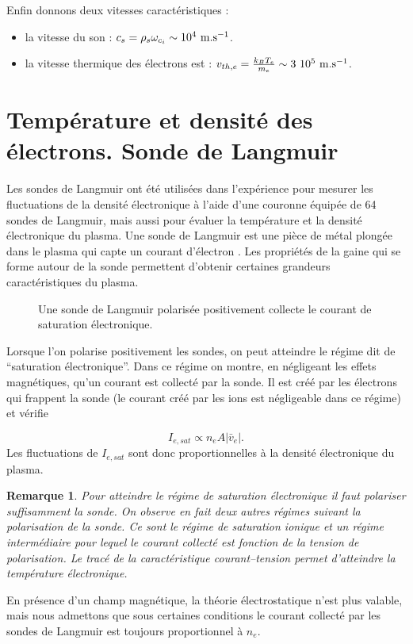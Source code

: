 \documentclass{book}
\newtheorem{rem}{Remarque}[chapter]
\begin{document}
Enfin donnons deux vitesses caract\'eristiques :
\begin{itemize}
\item la vitesse du son : $c_s=\rho_s\omega_{c_i}\sim 10^4 \ {\rm
m.s}^{-1}$. 
\item la vitesse thermique des \'electrons est :
$v_{th,e}=\frac{k_B T_e}{m_e}\sim 3\ 10^{5}\ {\rm m.s}^{-1}$.
\end{itemize}




\section{Temp\'erature et densit\'e des \'electrons. Sonde de Langmuir}
Les sondes de Langmuir ont \'et\'e utilis\'ees dans l'exp\'erience
pour 
mesurer les fluctuations de la densit\'e \'electronique \`a l'aide
d'une 
couronne \'equip\'ee de 64 sondes de Langmuir, mais aussi pour
\'evaluer la 
temp\'erature et la densit\'e \'electronique du plasma.
Une sonde de Langmuir est une pi\`ece de m\'etal plong\'ee
dans le plasma qui capte un courant d'\'electron \cite{Hershkowitz93}.
Les propri\'et\'es
\cite{Laframboise76,Rubinstein78,Rubinstein82,Rubinstein83}  de la
gaine qui se forme autour de la sonde permettent  
d'obtenir certaines grandeurs caract\'eristiques du plasma.
\begin{figure}[htb]
 \centerline{}   
 \caption{Une sonde de Langmuir polaris\'ee positivement collecte le
courant de saturation \'electronique.}
 \label{gainesonde}
\end{figure}
%
Lorsque l'on polarise positivement les sondes, on peut atteindre le
r\'egime dit de ``saturation \'electronique''. Dans ce r\'egime on
montre, 
en n\'egligeant les effets magn\'etiques, qu'un courant est collect\'e
par 
la sonde. Il est cr\'e\'e par les \'electrons qui frappent la sonde
(le 
courant cr\'e\'e par les ions est n\'egligeable dans ce r\'egime) et
v\'erifie 

\begin{equation}
I_{e,sat}\propto n_e A |\bar{v}_e|.
\end{equation}
Les fluctuations de $I_{e,sat}$ sont donc proportionnelles \`a la densit\'e
\'electronique du plasma.
\begin{rem}
Pour atteindre le r\'egime de saturation \'electronique il faut polariser
suffisamment la sonde. On observe en fait deux autres r\'egimes suivant
la polarisation de la sonde. Ce sont le r\'egime de saturation
ionique et un 
r\'egime interm\'ediaire pour lequel le courant collect\'e est fonction de
la tension de polarisation. Le trac\'e de la caract\'eristique
courant--tension permet d'atteindre la temp\'erature \'electronique.
\end{rem}
En pr\'esence d'un champ magn\'etique, la th\'eorie \'electrostatique
n'est 
plus valable, mais nous admettons que sous certaines conditions
\cite{Laframboise76} le courant collect\'e par les sondes de Langmuir
est toujours proportionnel \`a $n_e$.
\end{document}
